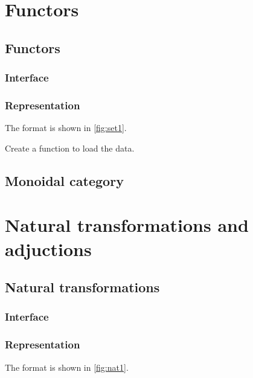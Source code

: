 \chapter{Functors}


\section{Functors}

\subsection*{Interface}

\subsection*{Representation}
The format is shown in \cref{fig:set1}.




\begin{exercise}
  Create a function to load the data.
%
\end{exercise}


\section{Monoidal category}


\chapter{Natural transformations and adjuctions}


\section{Natural transformations}

\subsection*{Interface}

\subsection*{Representation}
The format is shown in \cref{fig:nat1}.



